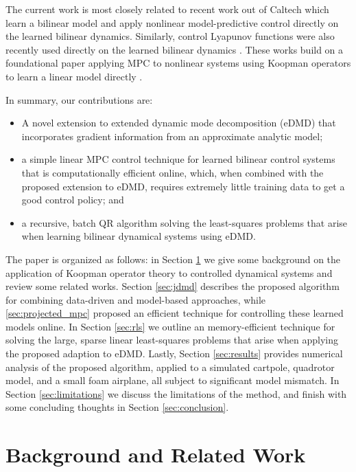 \documentclass{article}
\begin{document}
The current work is most closely related to recent work out of Caltech 
\cite{Folkestad2020,Folkestad2021,Folkestad2021a} which learn a bilinear
model and apply nonlinear model-predictive control directly on the learned bilinear 
dynamics. Similarly, control Lyapunov functions were also recently used directly on the 
learned bilinear dynamics \cite{Narasingam2022}. These works build on a foundational paper
applying MPC to nonlinear systems using Koopman operators to learn a linear model directly
\cite{Korda2018}.

In summary, our contributions are:
\begin{itemize}
  \item A novel extension to extended dynamic mode decomposition (eDMD) that
  incorporates gradient information from an approximate analytic model;
  
  \item a simple linear MPC control technique for learned bilinear control systems
  that is computationally efficient online, which, when combined with the proposed
  extension to eDMD, requires extremely little training data to get a good control
  policy; and
  
  \item a recursive, batch QR algorithm solving the least-squares problems that arise 
  when learning bilinear dynamical systems using eDMD.
\end{itemize}

The paper is organized as follows: in Section \ref{sec:Preliminaries/Background} we 
give some background on the application of Koopman operator theory to controlled 
dynamical systems and review some related works. Section \ref{sec:jdmd} describes
the proposed algorithm for combining data-driven and model-based approaches, while 
\ref{sec:projected_mpc} proposed an efficient technique for controlling these learned models
online. In Section \ref{sec:rls} we outline an memory-efficient technique for solving the 
large, sparse linear least-squares problems that arise when applying the proposed adaption 
to eDMD. Lastly, Section \ref{sec:results} provides numerical analysis of the 
proposed algorithm, applied to a simulated cartpole, quadrotor model, and a small foam 
airplane, all subject to significant model mismatch. In Section \ref{sec:limitations} we 
discuss the limitations of the method, and finish with some concluding thoughts in Section 
\ref{sec:conclusion}.

\section{Background and Related Work} \label{sec:Preliminaries/Background}
\end{document}
